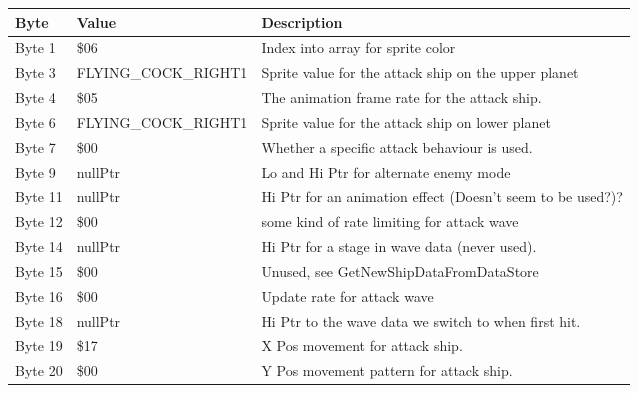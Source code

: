 \begin{figure}[H]
  {
  \setlength{\tabcolsep}{3.0pt}
  \setlength\cmidrulewidth{\heavyrulewidth} %
  \begin{adjustbox}{width=12cm}

\begin{tabular}{lll}
\toprule
 Byte    & Value                      & Description                                                        \\
\midrule
 Byte 1  & \$06                        & Index into array for sprite color                                  \\
 Byte 3  & FLYING\_COCK\_RIGHT1         & Sprite value for the attack ship on the upper planet               \\
 Byte 4  & \$05                        & The animation frame rate for the attack ship.                      \\
 Byte 6  & FLYING\_COCK\_RIGHT1         & Sprite value for the attack ship on lower planet                   \\
 Byte 7  & \$00                        & Whether a specific attack behaviour is used.                       \\
 Byte 9  & nullPtr                    & Lo and Hi Ptr for alternate enemy mode                             \\
 Byte 11 & nullPtr                    & Hi Ptr for an animation effect (Doesn't seem to be used?)?         \\
 Byte 12 & \$00                        & some kind of rate limiting for attack wave                         \\
 Byte 14 & nullPtr                    & Hi Ptr for a stage in wave data (never used).                      \\
 Byte 15 & \$00                        & Unused, see GetNewShipDataFromDataStore                            \\
 Byte 16 & \$00                        & Update rate for attack wave                                        \\
 Byte 18 & nullPtr                    & Hi Ptr to the wave data we switch to when first hit.               \\
 Byte 19 & \$17                        & X Pos movement for attack ship.                                    \\
 Byte 20 & \$00                        & Y Pos movement pattern for attack ship.                            \\

\end{tabular}
\end{adjustbox}}
\end{figure}
